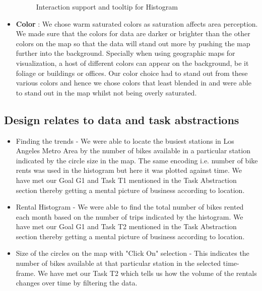 \begin{itemize}
\begin{figure}[h]
		\caption{\footnotesize{Interaction support and tooltip for Histogram}}
		\label{fig:First viz Chart}
		\captionsetup{justification=centering,margin=1cm}
		\vspace{-10pt}
	\end{figure}
	\item \textbf{Color} : We chose warm saturated colors as saturation affects area perception. We made sure that the colors for data are darker or brighter than the other colors on the map so that the data will stand out more by pushing the map further into the background. Specially when using geographic maps for visualization, a host of different colors can appear on the background, be it foliage or buildings or offices. Our color choice had to stand out from these various colors and hence we chose colors that least blended in and were able to stand out in the map whilst not being overly saturated.
\end{itemize}


\subsection{Design relates to data and task abstractions}
\label{sec:design relates to abstractions}

\begin{itemize}
	\item Finding the trends - We were able to locate the busiest stations in Los Angeles Metro Area by the number of bikes available in a particular station indicated by the circle size in the map. The same encoding i.e. number of bike rents was used in the histogram but here it was plotted against time. We have met our Goal G1 and Task T1 mentioned in the Task Abstraction section thereby getting a mental picture of business according to location.
	\item Rental Histogram - We were able to find the total number of bikes rented each month based on the number of trips indicated by the histogram. We have met our Goal G1 and Task T2 mentioned in the Task Abstraction section thereby getting a mental picture of business according to location.
	\item Size of the circles on the map with "Click On" selection - This indicates the number of bikes available at that particular station in the selected time-frame. We have met our Task T2 which tells us how the volume of the rentals changes over time by filtering the data.
\end{itemize}


